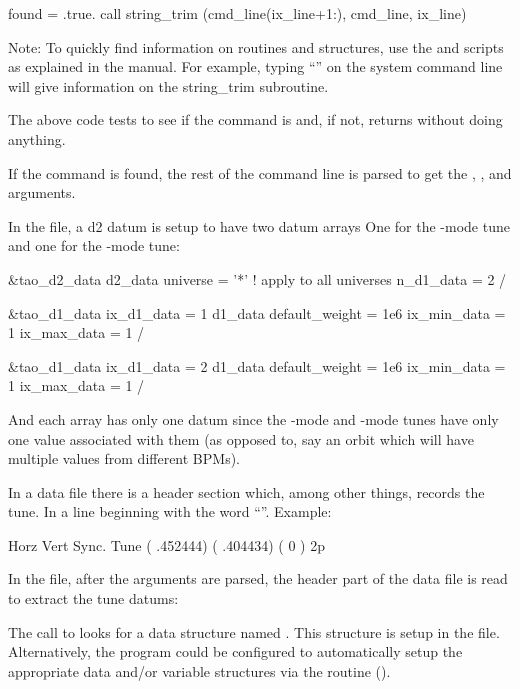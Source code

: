 {{{{\begin{example}
  found = .true.
  call string_trim (cmd_line(ix_line+1:), cmd_line, ix_line)
\end{example}

Note: To quickly find information on routines and structures, use the  and 
scripts as explained in the \bmad manual. For example, typing ``'' on the
system command line will give information on the string_trim subroutine.

The above code tests to see if the command is  and, if not, returns without doing
anything.

If the  command is found, the rest of the command line is parsed to get the
, , and  arguments.

In the  file, a  d2 datum is setup to have two  datum arrays One for
the -mode tune and one for the -mode tune:
\begin{example}
  \&tao_d2_data
    d2_data%
    universe = '*'  ! apply to all universes
    n_d1_data = 2
  /

  \&tao_d1_data
    ix_d1_data = 1
    d1_data%
    default_weight = 1e6
    ix_min_data = 1
    ix_max_data = 1
  /

  \&tao_d1_data
    ix_d1_data = 2
    d1_data%
    default_weight = 1e6
    ix_min_data = 1
    ix_max_data = 1
  /
\end{example}
And each  array has only one datum since the -mode and -mode tunes have only one
value associated with them (as opposed to, say an orbit which will have multiple values from
different BPMs).

In a data file there is a header section which, among other things, records the tune.
In a line beginning with the word ``''. Example:
\begin{example}
                   Horz         Vert         Sync.                           
   Tune           ( .452444)   ( .404434)   ( 0      ) 2p                    
\end{example}

In the  file, after the arguments are parsed, the header part of the
data file is read to extract the tune datums:
The call to  looks for a  data structure named . This structure is
setup in the  file. Alternatively, the  program could be configured to
automatically setup the appropriate data and/or variable structures via the 
routine ().

}}}}
